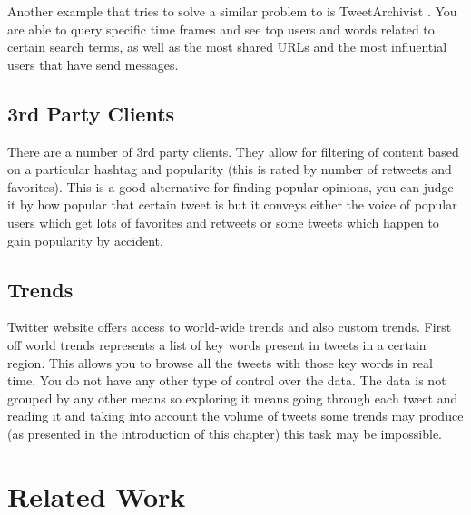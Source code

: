  Another example that tries to solve a similar problem to {\project} is TweetArchivist . You are able to query specific time frames and see top users and words related to certain search terms, as well as the most shared URLs and the most influential  users that have send messages.

\subsection{3rd Party Clients}
\label{sub-sec:tpc}

There are a number of 3rd party clients. They allow for filtering of content based on a particular hashtag and popularity (this is rated by number of retweets and favorites). This is a good alternative for finding popular opinions, you can judge it by how popular that certain tweet is but it conveys either the voice of popular users which get lots of favorites and retweets or some tweets which happen to gain popularity by accident.

\subsection{Trends}
\label{sub-sec:trends}

Twitter website offers access to world-wide trends and also custom trends. First off world trends represents a list of key words present in tweets in a certain region. This allows you to browse all the tweets with those key words in real time. You do not have any other type of control over the data. The data is not grouped by any other means so exploring it means going through each tweet and reading it and taking into account the volume of tweets some trends may produce (as presented in the introduction of this chapter) this task may be impossible.

\section{Related Work}
\label{sub-sec:rel-work}

